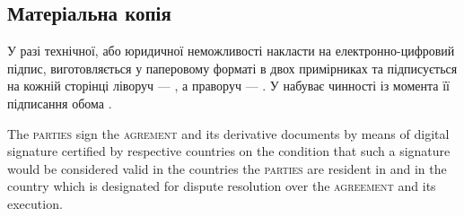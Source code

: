 \begin{Form}
\begin{paracol}{3}
{        \subsection{Матеріальна копія}
        У разі технічної, або юридичної неможливості накласти на  електронно-цифровий підпис,  виготовляється у паперовому форматі в двох примірниках та підписується на кожній сторінці ліворуч — , а праворуч — . У набуває чинності із момента її підписання обома .}
        {The \textsc{parties} sign the \textsc{agrement} and its derivative documents by means of digital signature certified by respective countries on the condition that such a signature would be considered valid in the countries the \textsc{parties} are resident in and in the country which is designated for dispute resolution over the \textsc{agreement} and its execution. 
}
\end{paracol}
\end{Form}
